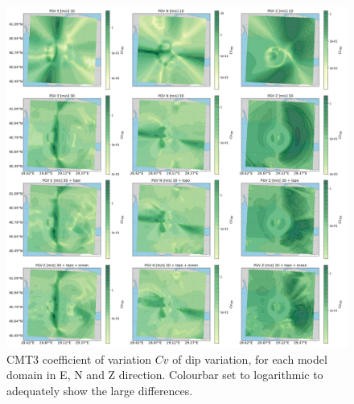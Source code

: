 \documentclass[../Text/00main.tex]{subfiles}
\begin{document}
\begin{figure}
    \centering
    \includegraphics[width=1\linewidth,trim = 2cm 5cm 1cm 5cm, clip]{images_results/dip_variation_sigma_sc3.png}
    \caption{CMT3 coefficient of variation $Cv$ of dip variation, for each model domain in E, N and Z direction. Colourbar set to logarithmic to adequately show the large differences.}
    \label{fig:cmt2sigm}
\end{figure}
\end{document}
